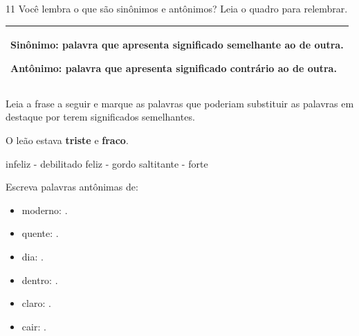 \begin{multicols}{2}







\end{multicols}

\num{11} Você lembra o que são sinônimos e antônimos? Leia o quadro para
relembrar.


\begin{longtable}[]{@{}l@{}}
\toprule
\begin{minipage}[t]{0.97\columnwidth}\raggedright\strut
\textbf{Sinônimo}: palavra que apresenta significado semelhante ao de
outra.

\textbf{Antônimo}: palavra que apresenta significado contrário ao de
outra.
\strut
\end{minipage}\tabularnewline
\bottomrule
\end{longtable}

\begin{escolha}[itemsep=-5pt]
\item Leia a frase a seguir e marque as palavras que poderiam substituir as
palavras em destaque por terem significados semelhantes.

O leão estava \textbf{triste} e \textbf{fraco}.

\begin{boxlist}
 infeliz - debilitado
 feliz - gordo
 saltitante - forte
\end{boxlist}

\item Escreva palavras antônimas de:

\begin{itemize}
\item
  moderno: .
\item
  quente: .
\item
  dia: .
\item
  dentro: .
\item
  claro: .
\item
  cair: .
\end{itemize}
\end{escolha}

